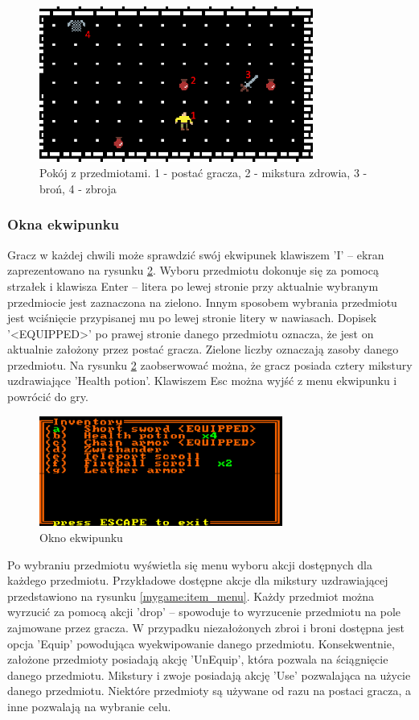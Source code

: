 \documentclass[12pt,twoside]{article}
\begin{document}
\FloatBarrier
\begin{figure}[ht]
	\centering
	\includegraphics[width=9cm]{images/mygame/item_room.png}
	\caption{Pokój z przedmiotami. 1 - postać gracza, 2 - mikstura zdrowia, 3 - broń, 4 - zbroja }
	\label{mygame:item_room}
\end{figure}
\FloatBarrier


\subsubsection{Okna ekwipunku}
Gracz w każdej chwili może sprawdzić swój ekwipunek klawiszem 'I' -- ekran zaprezentowano na rysunku \ref{mygame:inv}. Wyboru przedmiotu dokonuje się za pomocą strzałek i klawisza Enter -- litera po lewej stronie przy aktualnie wybranym przedmiocie jest zaznaczona na zielono. Innym sposobem wybrania przedmiotu jest wciśnięcie przypisanej mu po lewej stronie litery w nawiasach. Dopisek '<EQUIPPED>' po prawej stronie danego przedmiotu oznacza, że jest on aktualnie założony przez postać gracza. Zielone liczby oznaczają zasoby danego przedmiotu. Na rysunku \ref{mygame:inv}  zaobserwować można, że gracz posiada cztery mikstury uzdrawiające 'Health potion'. Klawiszem Esc można wyjść z menu ekwipunku i powrócić do gry.

\FloatBarrier
\begin{figure}[ht]
	\centering
	\includegraphics[width=8cm]{images/mygame/inv.png}
	\caption{Okno ekwipunku}
	\label{mygame:inv}
\end{figure}
\FloatBarrier

Po wybraniu przedmiotu wyświetla się menu wyboru akcji dostępnych dla każdego przedmiotu. Przykładowe dostępne akcje dla mikstury uzdrawiającej przedstawiono na rysunku \ref{mygame:item_menu}. Każdy przedmiot można wyrzucić za pomocą akcji 'drop' -- spowoduje to wyrzucenie przedmiotu na pole zajmowane przez gracza. W przypadku niezałożonych zbroi i broni dostępna jest opcja 'Equip' powodująca wyekwipowanie danego przedmiotu. Konsekwentnie, założone przedmioty posiadają akcję 'UnEquip', która pozwala na ściągnięcie danego przedmiotu. Mikstury i zwoje posiadają akcję 'Use' pozwalająca na użycie danego przedmiotu. Niektóre przedmioty są używane od razu na postaci gracza, a inne pozwalają na wybranie celu.
\end{document}
